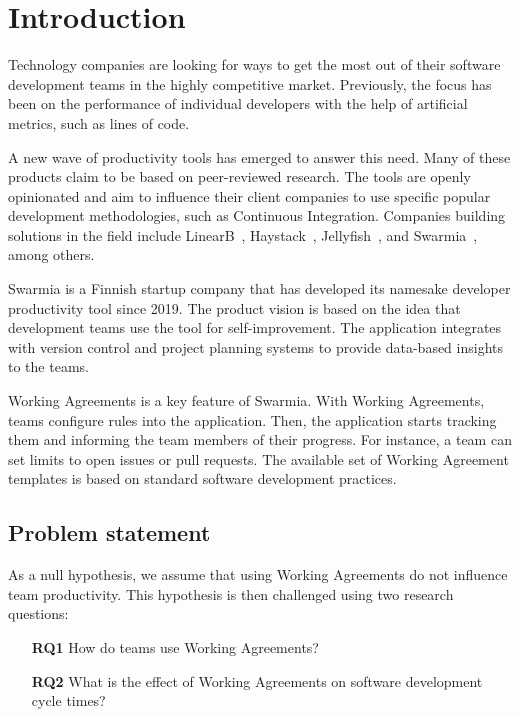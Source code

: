 \chapter{Introduction}

Technology companies are looking for ways to get the most out of their software development teams in the highly competitive market. Previously, the focus has been on the performance of individual developers with the help of artificial metrics, such as lines of code. 

A new wave of productivity tools has emerged to answer this need. Many of these products claim to be based on peer-reviewed research. The tools are openly opinionated and aim to influence their client companies to use specific popular development methodologies, such as Continuous Integration. Companies building solutions in the field include LinearB~\cite{linearb_developer_2022}, Haystack~\cite{haystack_haystack_2022}, Jellyfish~\cite{jellyfish_align_2022}, and Swarmia~\cite{swarmia_gain_2022}, among others.

Swarmia is a Finnish startup company that has developed its namesake developer productivity tool since 2019. The product vision is based on the idea that development teams use the tool for self-improvement. The application integrates with version control and project planning systems to provide data-based insights to the teams. 

Working Agreements is a key feature of Swarmia. With Working Agreements, teams configure rules into the application. Then, the application starts tracking them and informing the team members of their progress. For instance, a team can set limits to open issues or pull requests. The available set of Working Agreement templates is based on standard software development practices. 

\section{Problem statement}

As a null hypothesis, we assume that using Working Agreements do not influence team productivity. This hypothesis is then challenged using two research questions: 

\begin{enumerate}
    \item[{\bf RQ1}] How do teams use Working Agreements?
    \item[{\bf RQ2}] What is the effect of Working Agreements on software development cycle times?
\end{enumerate}

